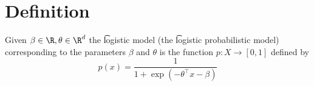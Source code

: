 

\section*{Definition}

Given $\beta  \in \R , \theta  \in \R ^d$ the \t{logistic model} (the \t{logistic probabilistic model}) corresponding to the parameters $\beta $ and $\theta $ is the function $p: X \to [0, 1]$ defined by
\[
p(x) = \frac{1}{1 + \exp(-\theta ^\top x - \beta )}
\]

\blankpage
